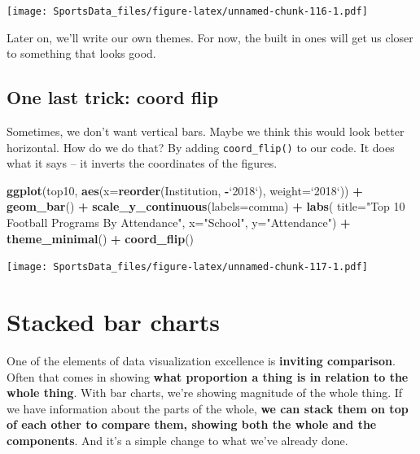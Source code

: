 \documentclass[
]{book}
\newenvironment{Shaded}{\begin{snugshade}}{\end{snugshade}}
\newcommand{\DataTypeTok}[1]{\textcolor[rgb]{0.13,0.29,0.53}{#1}}
\newcommand{\KeywordTok}[1]{\textcolor[rgb]{0.13,0.29,0.53}{\textbf{#1}}}
\newcommand{\NormalTok}[1]{#1}
\newcommand{\OperatorTok}[1]{\textcolor[rgb]{0.81,0.36,0.00}{\textbf{#1}}}
\newcommand{\StringTok}[1]{\textcolor[rgb]{0.31,0.60,0.02}{#1}}
\begin{document}
\texttt{[image: SportsData\_files/figure-latex/unnamed-chunk-116-1.pdf]}

Later on, we'll write our own themes. For now, the built in ones will get us closer to something that looks good.

\hypertarget{one-last-trick-coord-flip}{%
\section{One last trick: coord flip}\label{one-last-trick-coord-flip}}

Sometimes, we don't want vertical bars. Maybe we think this would look better horizontal. How do we do that? By adding \texttt{coord\_flip()} to our code. It does what it says -- it inverts the coordinates of the figures.

\begin{Shaded}
\begin{Highlighting}[]
\KeywordTok{ggplot}\NormalTok{(top10, }\KeywordTok{aes}\NormalTok{(}\DataTypeTok{x=}\KeywordTok{reorder}\NormalTok{(Institution, }\OperatorTok{-}\StringTok{`}\DataTypeTok{2018}\StringTok{`}\NormalTok{), }\DataTypeTok{weight=}\StringTok{`}\DataTypeTok{2018}\StringTok{`}\NormalTok{)) }\OperatorTok{+}\StringTok{ }
\StringTok{  }\KeywordTok{geom_bar}\NormalTok{() }\OperatorTok{+}\StringTok{ }
\StringTok{  }\KeywordTok{scale_y_continuous}\NormalTok{(}\DataTypeTok{labels=}\NormalTok{comma) }\OperatorTok{+}\StringTok{ }
\StringTok{  }\KeywordTok{labs}\NormalTok{(}
    \DataTypeTok{title=}\StringTok{"Top 10 Football Programs By Attendance"}\NormalTok{, }
    \DataTypeTok{x=}\StringTok{"School"}\NormalTok{, }
    \DataTypeTok{y=}\StringTok{"Attendance"}\NormalTok{) }\OperatorTok{+}\StringTok{ }
\StringTok{  }\KeywordTok{theme_minimal}\NormalTok{() }\OperatorTok{+}\StringTok{ }
\StringTok{  }\KeywordTok{coord_flip}\NormalTok{()}
\end{Highlighting}
\end{Shaded}

\texttt{[image: SportsData\_files/figure-latex/unnamed-chunk-117-1.pdf]}

\hypertarget{stacked-bar-charts}{%
\chapter{Stacked bar charts}\label{stacked-bar-charts}}

One of the elements of data visualization excellence is \textbf{inviting comparison}. Often that comes in showing \textbf{what proportion a thing is in relation to the whole thing}. With bar charts, we're showing magnitude of the whole thing. If we have information about the parts of the whole, \textbf{we can stack them on top of each other to compare them, showing both the whole and the components}. And it's a simple change to what we've already done.
\end{document}
